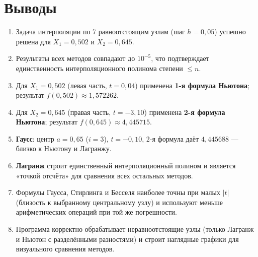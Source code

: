 \documentclass[a4paper,12pt]{article}
\begin{document}
\newpage
\section{Выводы}

\begin{enumerate}
    \item Задача интерполяции по 7 равноотстоящим узлам (шаг $h=0{,}05$)
          успешно решена для $X_1=0{,}502$ и $X_2=0{,}645$.

    \item Результаты всех методов совпадают до $10^{-5}$, что подтверждает
          единственность интерполяционного полинома степени $\le n$.

    \item Для $X_1=0{,}502$ (левая часть, $t=0{,}04$) применена \textbf{1-я
          формула Ньютона}; результат $f(0{,}502)\approx1{,}572262$.

    \item Для $X_2=0{,}645$ (правая часть, $t=-3{,}10$) применена \textbf{2-я
          формула Ньютона}; результат $f(0{,}645)\approx4{,}445715$.

    \item \textbf{Гаусс}: центр $a=0{,}65$ ($i=3$), $t=-0{,}10$,
          2-я формула даёт $4{,}445688$ --- близко к Ньютону и Лагранжу.

    \item \textbf{Лагранж} строит единственный интерполяционный полином и
          является «точкой отсчёта» для сравнения всех остальных методов.

    \item Формулы Гаусса, Стирлинга и Бесселя наиболее точны при малых $|t|$
          (близость к выбранному центральному узлу) и используют меньше
          арифметических операций при той же погрешности.

    \item Программа корректно обрабатывает неравноотстоящие узлы (только
          Лагранж и Ньютон с разделёнными разностями) и строит наглядные
          графики для визуального сравнения методов.
\end{enumerate}
\end{document}
